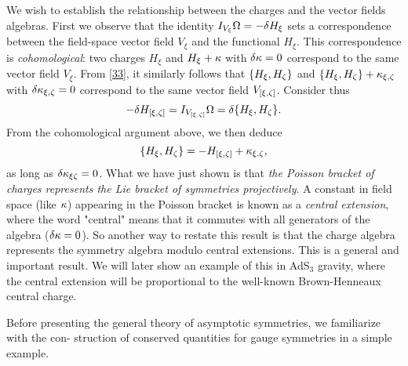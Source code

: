 We wish to establish the relationship between the charges and the vector fields algebras. First we observe that the identity $I_{V_\xi }\Omega=-\delta H_\xi $ sets a correspondence between the field-space vector field $V_\xi $ and the functional $H_\xi $. This correspondence is \textit{cohomological}: two charges $H_\xi $ and $H_\xi +\kappa $ with $\delta\kappa=0$ correspond to the same vector field $V_\xi $. From \eqref{33}, it similarly follows that $\{H_\xi ,H_\zeta \}$ and $\{H_\xi ,H_\zeta \}+\kappa_{\xi,\zeta }$ with $\delta\kappa _{\xi,\zeta }=0$ correspond to the same vector field $V_{[\xi,\zeta ]}$. Consider thus
\begin{equation}\label{38}
	-\delta H_{[\xi,\zeta ]}=I_{V_{[\xi,\zeta ]}}\Omega=\delta\{H_\xi,H_\zeta \}.
\end{equation}
From the cohomological argument above, we then deduce
\begin{equation}\label{39}
	\{H_\xi ,H_\zeta \}=-H_{[\xi,\zeta ]}+\kappa_{\xi,\zeta },
\end{equation}
as long as $\delta\kappa _{\xi\zeta }=0$. What we have just shown is that \textit{the Poisson bracket of charges represents the Lie bracket of symmetries projectively}. A constant in field space (like $\kappa $) appearing in the Poisson bracket is known as a \textit{central extension}, where the word "central" means that it commutes with all generators of the algebra ($\delta\kappa =0$). So another way to restate this result is that the charge algebra represents the symmetry algebra modulo central extensions. This is a general and important result. We will later show an example of this in AdS$_3$ gravity, where the central extension will be proportional to the well-known Brown-Henneaux central charge.

Before presenting the general theory of asymptotic symmetries, we familiarize with the con- struction of conserved quantities for gauge symmetries in a simple example.
 
 

 
 
 

 
 
 

 
 
 

 
 
 

 
 
 

 
 
 

 
 
 
